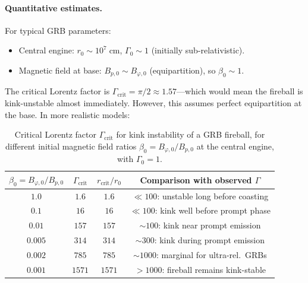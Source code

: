 \paragraph{Quantitative estimates.}
For typical GRB parameters:
\begin{itemize}
\item Central engine: $r_{0} \sim 10^{7}\;\mathrm{cm}$,
  $\Gamma_{0} \sim 1$ (initially sub-relativistic).
\item Magnetic field at base: $B_{p,0} \sim B_{\varphi,0}$
  (equipartition), so $\beta_{0} \sim 1$.
\end{itemize}

The critical Lorentz factor is
$\Gamma_{\mathrm{crit}} = \pi/2 \approx 1.57$---which would mean
the fireball is kink-unstable almost immediately.  However, this
assumes perfect equipartition at the base.  In more realistic
models:

\begin{table}[htbp]
\centering
\caption{Critical Lorentz factor $\Gamma_{\mathrm{crit}}$ for kink
instability of a GRB fireball, for different initial magnetic
field ratios $\beta_{0} = B_{\varphi,0}/B_{p,0}$ at the central
engine, with $\Gamma_{0} = 1$.}
\label{tab:rel-GRB-Gcrit}
\begin{tabular}{cccc}
\hline
$\beta_{0} = B_{\varphi,0}/B_{p,0}$ &
$\Gamma_{\mathrm{crit}}$ &
$r_{\mathrm{crit}}/r_{0}$ &
Comparison with observed $\Gamma$\\
\hline
$1.0$   & $1.6$ & $1.6$ &
  $\ll 100$: unstable long before coasting \\
$0.1$   & $16$ & $16$ &
  $\ll 100$: kink well before prompt phase \\
$0.01$  & $157$ & $157$ &
  $\sim 100$: kink near prompt emission \\
$0.005$ & $314$ & $314$ &
  $\sim 300$: kink during prompt emission \\
$0.002$ & $785$ & $785$ &
  $\sim 1000$: marginal for ultra-rel.\ GRBs \\
$0.001$ & $1571$ & $1571$ &
  $>1000$: fireball remains kink-stable \\
\hline
\end{tabular}
\end{table}

